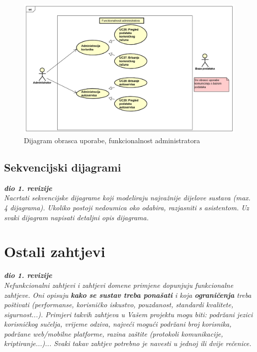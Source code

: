 					\begin{figure}[H]
						\includegraphics[width=\linewidth]{dijagrami/diagram2.png}
						\centering
						\caption{Dijagram obrasca uporabe, funkcionalnost administratora}
						\label{fig:diagram2}
					\end{figure}
				
					
				\eject		
				
			\subsection{Sekvencijski dijagrami}
				
				\textbf{\textit{dio 1. revizije}}\\
				
				\textit{Nacrtati sekvencijske dijagrame koji modeliraju najvažnije dijelove sustava (max. 4 dijagrama). Ukoliko postoji nedoumica oko odabira, razjasniti s asistentom. Uz svaki dijagram napisati detaljni opis dijagrama.}
				\eject
	
		\section{Ostali zahtjevi}
		
			\textbf{\textit{dio 1. revizije}}\\
		 
			 \textit{Nefunkcionalni zahtjevi i zahtjevi domene primjene dopunjuju funkcionalne zahtjeve. Oni opisuju \textbf{kako se sustav treba ponašati} i koja \textbf{ograničenja} treba poštivati (performanse, korisničko iskustvo, pouzdanost, standardi kvalitete, sigurnost...). Primjeri takvih zahtjeva u Vašem projektu mogu biti: podržani jezici korisničkog sučelja, vrijeme odziva, najveći mogući podržani broj korisnika, podržane web/mobilne platforme, razina zaštite (protokoli komunikacije, kriptiranje...)... Svaki takav zahtjev potrebno je navesti u jednoj ili dvije rečenice.}
			 
			 
			 
	